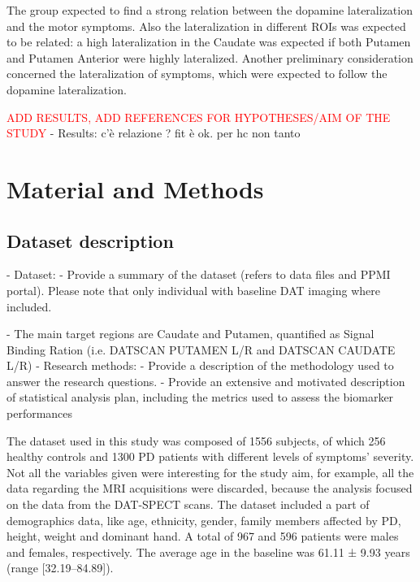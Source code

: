 \documentclass[]{article}
\begin{document}
\begin{multicols}{2}
\newline
The group expected to find a strong relation between the dopamine lateralization and the motor symptoms. Also the lateralization in different ROIs was expected to be related: a high lateralization in the Caudate was expected if both Putamen and Putamen Anterior were highly lateralized. Another preliminary consideration concerned the lateralization of symptoms, which were expected to follow the dopamine lateralization. 

\textcolor{red}{ADD RESULTS, ADD REFERENCES FOR HYPOTHESES/AIM OF THE STUDY}
- Results: c'è relazione ? fit è ok. per hc non tanto

\section{Material and Methods}

\subsection{Dataset description}

- Dataset:
\newline
	- Provide a summary of the dataset (refers to data files and PPMI
	portal). Please note that only individual with baseline DAT imaging 
	where included.
\newline

	- The main target regions are Caudate and Putamen, quantified as 
	Signal Binding Ration (i.e. DATSCAN PUTAMEN L/R and 
	DATSCAN CAUDATE L/R)
\newline
- Research methods:
\newline
	- Provide a description of the methodology used to answer the research 
	questions. 
	\newline
	- Provide an extensive and motivated description of statistical analysis plan, including the metrics used to assess the biomarker 
	performances
	
The dataset used in this study was composed of 1556 subjects, of which 256 healthy controls and 1300 PD patients with different levels of symptoms' severity. Not all the variables given were interesting for the study aim, for example, all the data regarding the MRI acquisitions were discarded, because the analysis focused on the data from the DAT-SPECT scans. 
\newline
The dataset included a part of demographics data, like age, ethnicity, gender, family members affected by PD, height, weight and dominant hand.
A total of 967 and 596 patients were males and females, respectively. The average age in the baseline was 61.11 ± 9.93 years (range [32.19–84.89]). 


\end{multicols}
\end{document}
